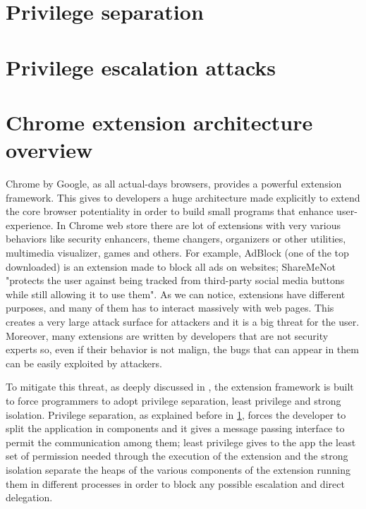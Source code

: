 \section{Privilege separation}
\label{sec:PriviSep}

\section{Privilege escalation attacks}
\label{sec:Escalation}

\section{Chrome extension architecture overview}
\label{sec:ExtOverview}
Chrome by Google, as all actual-days browsers, provides a powerful extension framework. This gives to developers a huge architecture made explicitly to extend the core browser potentiality in order to build small programs that enhance user-experience. In Chrome web store there are lot of extensions with very various behaviors like security enhancers, theme changers, organizers or other utilities, multimedia visualizer, games and others. For example, AdBlock (one of the top downloaded) is an extension made to block all ads on websites; ShareMeNot "protects the user against being tracked from third-party social media buttons while still allowing it to use them"\cite{ShareMeNot}. As we can notice, extensions have different purposes, and many of them has to interact massively with web pages. This creates a very large attack surface for attackers and it is a big threat for the user. Moreover, many extensions are written by developers that are not security experts so, even if their behavior is not malign, the bugs that can appear in them can be easily exploited by attackers.

To mitigate this threat, as deeply discussed in \cite{ChromeExtSpec}, the extension framework is built to force programmers to adopt privilege separation, least privilege and strong isolation. Privilege separation, as explained before in \ref{sec:PriviSep}, forces the developer to split the application in components and it gives a message passing interface to permit the communication among them; least privilege gives to the app the least set of permission needed through the execution of the extension and the strong isolation separate the heaps of the various components of the extension running them in different processes in order to block any possible escalation and direct delegation.


